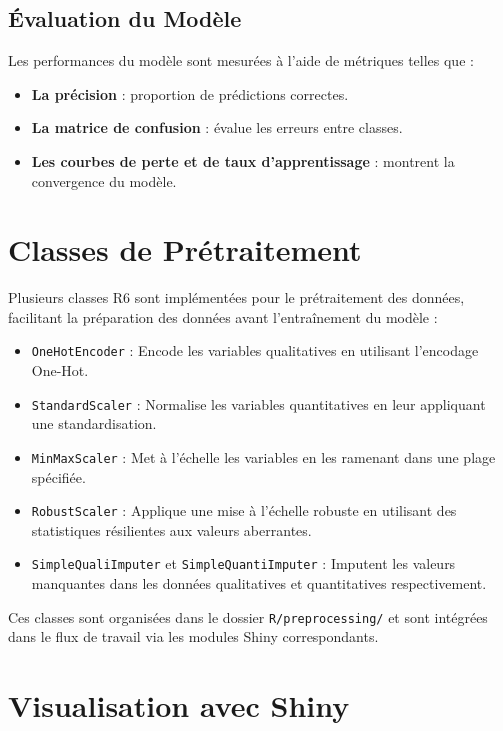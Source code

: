 \documentclass[a4paper,12pt]{article}
\begin{document}
\subsection{Évaluation du Modèle}
Les performances du modèle sont mesurées à l'aide de métriques telles que :
\begin{itemize}
    \item \textbf{La précision} : proportion de prédictions correctes.
    \item \textbf{La matrice de confusion} : évalue les erreurs entre classes.
    \item \textbf{Les courbes de perte et de taux d’apprentissage} : montrent la convergence du modèle.
\end{itemize}

\section{Classes de Prétraitement}

Plusieurs classes R6 sont implémentées pour le prétraitement des données, facilitant la préparation des données avant l'entraînement du modèle :

\begin{itemize}
    \item \texttt{OneHotEncoder} : Encode les variables qualitatives en utilisant l'encodage One-Hot.
    \item \texttt{StandardScaler} : Normalise les variables quantitatives en leur appliquant une standardisation.
    \item \texttt{MinMaxScaler} : Met à l'échelle les variables en les ramenant dans une plage spécifiée.
    \item \texttt{RobustScaler} : Applique une mise à l'échelle robuste en utilisant des statistiques résilientes aux valeurs aberrantes.
    \item \texttt{SimpleQualiImputer} et \texttt{SimpleQuantiImputer} : Imputent les valeurs manquantes dans les données qualitatives et quantitatives respectivement.\\
\end{itemize}

Ces classes sont organisées dans le dossier \texttt{R/preprocessing/} et sont intégrées dans le flux de travail via les modules Shiny correspondants.

\section{Visualisation avec Shiny}
\end{document}
